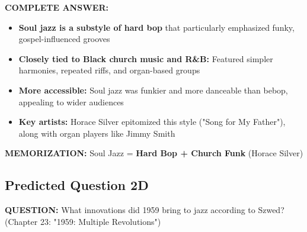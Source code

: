 \documentclass[11pt]{article}
\begin{document}
\begin{mdframed}[backgroundcolor=answercolor!10, linewidth=2pt]
\textbf{\textcolor{answercolor}{COMPLETE ANSWER:}}

\begin{itemize}[leftmargin=*, nosep]
    \item \textbf{Soul jazz is a substyle of hard bop} that particularly emphasized funky, gospel-influenced grooves
    \item \textbf{Closely tied to Black church music and R\&B:} Featured simpler harmonies, repeated riffs, and organ-based groups
    \item \textbf{More accessible:} Soul jazz was funkier and more danceable than bebop, appealing to wider audiences
    \item \textbf{Key artists:} Horace Silver epitomized this style ("Song for My Father"), along with organ players like Jimmy Smith
\end{itemize}

\vspace{5pt}
\end{mdframed}

\textbf{MEMORIZATION:} Soul Jazz = \textbf{\textcolor{hardbop}{Hard Bop + Church Funk}} (Horace Silver)

\subsection*{Predicted Question 2D}

\begin{mdframed}[backgroundcolor=questioncolor!10, linewidth=2pt]
\textbf{\textcolor{questioncolor}{QUESTION:}} What innovations did 1959 bring to jazz according to Szwed? (Chapter 23: "1959: Multiple Revolutions")
\end{mdframed}
\end{document}
